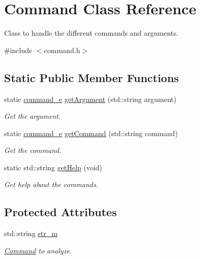 \hypertarget{class_command}{}\section{Command Class Reference}
\label{class_command}


Class to handle the different commands and arguments.  




{\ttfamily \#include $<$command.\+h$>$}

\subsection*{Static Public Member Functions}
\begin{DoxyCompactItemize}
\item 
static \hyperlink{command_8h_aafce48252f7b3163fa15e458dd84ba12}{command\+\_\+e} \hyperlink{class_command_ae11f4e8caf8655b98791f0a2f779d245}{get\+Argument} (std\+::string argument)
\begin{DoxyCompactList}\small\item\em Get the argument. \end{DoxyCompactList}\item 
static \hyperlink{command_8h_aafce48252f7b3163fa15e458dd84ba12}{command\+\_\+e} \hyperlink{class_command_a0a461c50ca91c39c699d35da1ae4d66d}{get\+Command} (std\+::string command)
\begin{DoxyCompactList}\small\item\em Get the command. \end{DoxyCompactList}\item 
static std\+::string \hyperlink{class_command_a533d4d8df620c9dd0c36c4d67a379ae5}{get\+Help} (void)
\begin{DoxyCompactList}\small\item\em Get help about the commands. \end{DoxyCompactList}\end{DoxyCompactItemize}
\subsection*{Protected Attributes}
\begin{DoxyCompactItemize}
\item 
\hypertarget{class_command_a42400397858e26d0130e6eb7db208126}{}std\+::string \hyperlink{class_command_a42400397858e26d0130e6eb7db208126}{str\+\_\+m}\label{class_command_a42400397858e26d0130e6eb7db208126}

\begin{DoxyCompactList}\small\item\em \hyperlink{class_command}{Command} to analyze. \end{DoxyCompactList}\end{DoxyCompactItemize}


